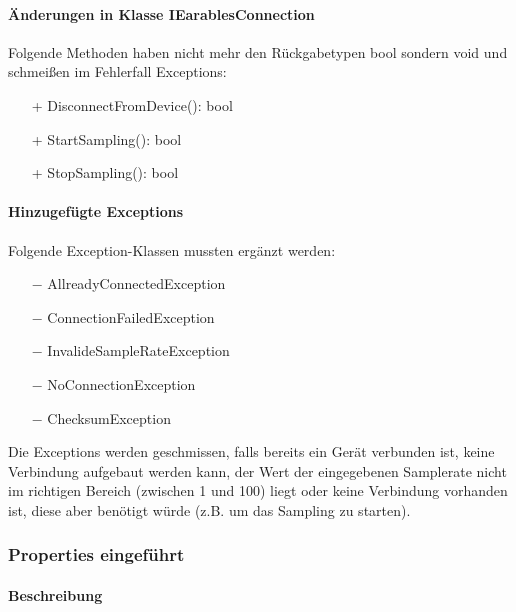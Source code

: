 \documentclass[a4paper,12pt]{article}
\begin{document}
\paragraph{Änderungen in Klasse IEarablesConnection}
Folgende Methoden haben nicht mehr den Rückgabetypen bool sondern void und schmeißen im Fehlerfall Exceptions:
\begin{itemize}
	\item[+] DisconnectFromDevice(): bool
	\item[+] StartSampling(): bool
	\item[+] StopSampling(): bool
\end{itemize} 
\paragraph{Hinzugefügte Exceptions}
Folgende Exception-Klassen mussten ergänzt werden:
\begin{itemize}
	\item[$-$] AllreadyConnectedException
	\item[$-$] ConnectionFailedException
	\item[$-$] InvalideSampleRateException
	\item[$-$] NoConnectionException
	\item[$-$] ChecksumException %
\end{itemize}
Die Exceptions werden geschmissen, falls bereits ein Gerät verbunden ist, keine Verbindung aufgebaut werden kann, der Wert der eingegebenen Samplerate nicht im richtigen Bereich (zwischen 1 und 100) liegt oder keine Verbindung vorhanden ist, diese aber benötigt würde (z.B. um das Sampling zu starten).

\subsubsection{Properties eingeführt}
\paragraph{Beschreibung}
\end{document}
